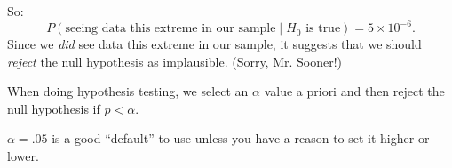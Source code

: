 \documentclass{beamer}\usepackage[]{graphicx}\usepackage[]{color}
\begin{document}
\begin{darkframes}
\begin{frame}
So:
\[
  P(\text{seeing data this extreme in our sample} \mid \text{$H_0$ is true}) = 5 \times 10^{-6}.
\]
\pause
Since we \emph{did} see data this extreme in our sample, it suggests that we should \emph{reject} the null hypothesis as implausible. (Sorry, Mr. Sooner!)
\pause\bigskip

When doing hypothesis testing, we select an $\alpha$ value a priori and then reject the null hypothesis if $p<\alpha$.
\pause\bigskip

$\alpha=.05$ is a good ``default'' to use unless you have a reason to set it higher or lower.
\end{frame}

\end{darkframes}
\end{document}
